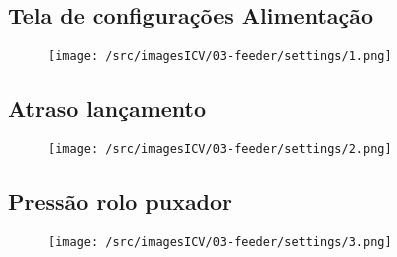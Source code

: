 
\newpage
\thispagestyle{fancy}
\vspace{\fill}
\subsection{Tela de configurações Alimentação}
\begin{figure}
    \centering
    \texttt{[image: /src/imagesICV/03-feeder/settings/1.png]}
\end{figure}

\newpage
\thispagestyle{fancy}
\vspace{\fill}
\subsection{Atraso lançamento}
\begin{figure}
    \centering
    \texttt{[image: /src/imagesICV/03-feeder/settings/2.png]}
\end{figure}

\newpage
\thispagestyle{fancy}
\vspace{\fill}
\subsection{Pressão rolo puxador}
\begin{figure}
    \centering
    \texttt{[image: /src/imagesICV/03-feeder/settings/3.png]}
\end{figure}
